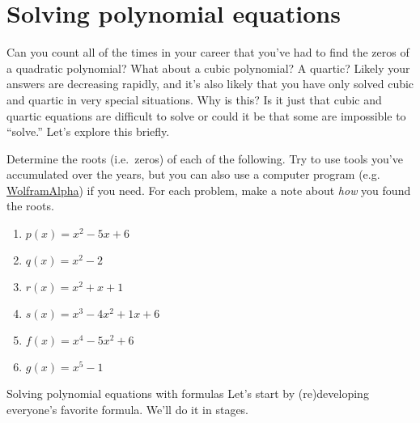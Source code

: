 \chapter{Solving polynomial equations}
\label{chapter:PolyEquations}
\thispagestyle{empty}



Can you count all of the times in your career that you've had to find the zeros of a quadratic polynomial? What about a cubic polynomial? A quartic? Likely your answers are decreasing rapidly, and it's also likely that you have only solved cubic and quartic in very special situations. Why is this? Is it just that cubic and quartic equations are difficult to solve or could it be that some are impossible to ``solve.'' Let's explore this briefly.

\begin{exercise}
Determine the roots (i.e.\ zeros) of each of the following. Try to use tools you've accumulated over the years, but you can also use a computer program (e.g. \href{https://www.wolframalpha.com}{WolframAlpha}) if you need. For each problem, make a note about \emph{how} you found the roots.
\begin{multicols}{2}
\begin{enumerate}
\item $p(x) = x^2 - 5x + 6$
\item $q(x) = x^2 - 2$
\item $r(x) = x^2 + x + 1$
\item $s(x) = x^3 - 4x^2 + 1x + 6$
\item $f(x) = x^4 - 5x^2 + 6$
\item $g(x) = x^5 - 1$
\end{enumerate}
\end{multicols}
\end{exercise}

\begin{section}{Solving polynomial equations with formulas}
Let's start by (re)developing everyone's favorite formula. We'll do it in stages.



\end{section}
